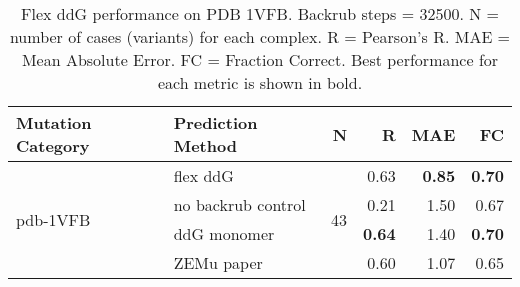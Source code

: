 \begin{table}
  \begin{tabular}{llrrrr}
\toprule
Mutation Category &   Prediction Method &   N &    R &  MAE &   FC \\
\midrule
 \multirow{ 4}{*}{pdb-1VFB} & flex ddG & \multirow{ 4}{*}{43} & 0.63 & \textbf{0.85} & \textbf{0.70}  \\
 & no backrub control & & 0.21 & 1.50 & 0.67  \\
 & ddG monomer & & \textbf{0.64} & 1.40 & \textbf{0.70}  \\
 & ZEMu paper & & 0.60 & 1.07 & 0.65  \\
\bottomrule
\end{tabular}
  \caption[Flex ddG performance on PDB 1VFB]{
    Flex ddG performance on PDB 1VFB. Backrub steps = 32500. N = number of cases (variants) for each complex. R = Pearson's R. MAE = Mean Absolute Error. FC = Fraction Correct. Best performance for each metric is shown in bold.
  } \label{tab:table-pdb-1VFB}
\end{table}
